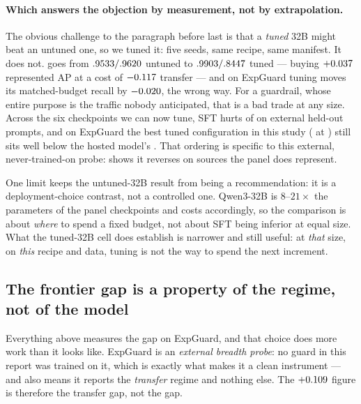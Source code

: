 \documentclass[11pt]{article}
\begin{document}
\paragraph{Which answers the objection by measurement, not by extrapolation.} The obvious
challenge to the paragraph before last is that a \emph{tuned} 32B might beat an untuned one, so
we tuned it: five seeds, same recipe, same manifest. It does not.
\FrontierScaleTunedName{} goes from
$.9533/.9620$ untuned to
$.9903/.8447$ tuned --- buying
$+0.037$ represented AP at a cost of
$-0.117$ transfer --- and on ExpGuard tuning moves its matched-budget
recall by $-0.020$, the wrong way. For a guardrail, whose entire
purpose is the traffic nobody anticipated, that is a bad trade at any size. Across the six
checkpoints we can now tune, SFT hurts \FrontierSftNumHurt{} of \FrontierSftNumTotal{} on
external held-out prompts, and on ExpGuard the best tuned configuration in this study
(\FrontierBestSftName{} at \FrontierBestSftTpr) still sits well below the hosted model's
\FrontierBestTpr. That ordering is specific to this external, never-trained-on probe:
 shows it reverses on sources the panel does represent.

One limit keeps the untuned-32B result from being a recommendation: it is a deployment-choice
contrast, not a controlled one. Qwen3-32B is $8$--$21\times$ the parameters of the panel
checkpoints and costs accordingly, so the comparison is about \emph{where} to spend a fixed
budget, not about SFT being inferior at equal size. What the tuned-32B cell does establish is
narrower and still useful: at \emph{that} size, on \emph{this} recipe and data, tuning is not
the way to spend the next increment.



\subsection{The frontier gap is a property of the regime, not of the model}
\label{sec:actIII-h2h}
Everything above measures the gap on ExpGuard, and that choice does more work than it looks
like. ExpGuard is an \emph{external breadth probe}: no guard in this report was trained on it,
which is exactly what makes it a clean instrument --- and also means it reports the
\emph{transfer} regime and nothing else. The $+0.109$ figure is therefore the
transfer gap, not the gap.
\end{document}
